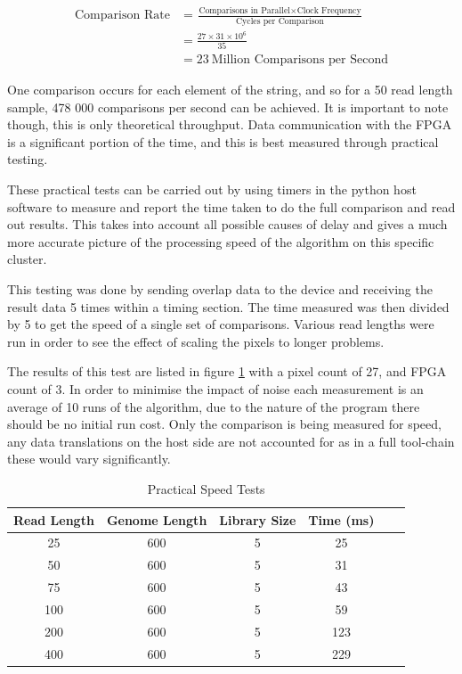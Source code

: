 \begin{align*}
\text{Comparison Rate} &= \frac{\text{Comparisons in Parallel} \times \text{Clock Frequency}}{\text{Cycles per Comparison}} \\
&= \frac{27\times 31\times 10^6}{35} \\
&= 23~\text{Million Comparisons per Second}
\end{align*}

One comparison occurs for each element of the string, and so for a 50 read length sample, 478 000 comparisons per second can be achieved. It is important to note though, this is only theoretical throughput. Data communication with the FPGA is a significant portion of the time, and this is best measured through practical testing. 


These practical tests can be carried out by using timers in the python host software to measure and report the time taken to do the full comparison and read out results. This takes into account all possible causes of delay and gives a much more accurate picture of the processing speed of the algorithm on this specific cluster.

This testing was done by sending overlap data to the device and receiving the result data 5 times within a timing section. The time measured was then divided by 5 to get the speed of a single set of comparisons. Various read lengths were run in order to see the effect of scaling the pixels to longer problems. 

The results of this test are listed in figure \ref{table:speed} with a pixel count of 27, and FPGA count of 3.  In order to minimise the impact of noise each measurement is an average of 10 runs of the algorithm, due to the nature of the program there should be no initial run cost. Only the comparison is being measured for speed, any data translations on the host side are not accounted for as in a full tool-chain these would vary significantly.


\begin{table}[!h]
\centering %
\begin{tabular}{c c c c c c} %
\hline\hline %
Read Length & Genome Length & Library Size & Time (ms)\\ [0.5ex] %
\hline %
25 & 600 & 5 & 25\\ %
50 & 600 & 5 & 31\\ %
75 & 600 & 5 & 43\\ %
100 & 600 & 5 & 59\\ %
200 & 600 & 5 & 123\\ %
400 & 600 & 5 & 229\\ %
\hline
\end{tabular}
\caption{Practical Speed Tests} %
\label{table:speed}
\end{table}



